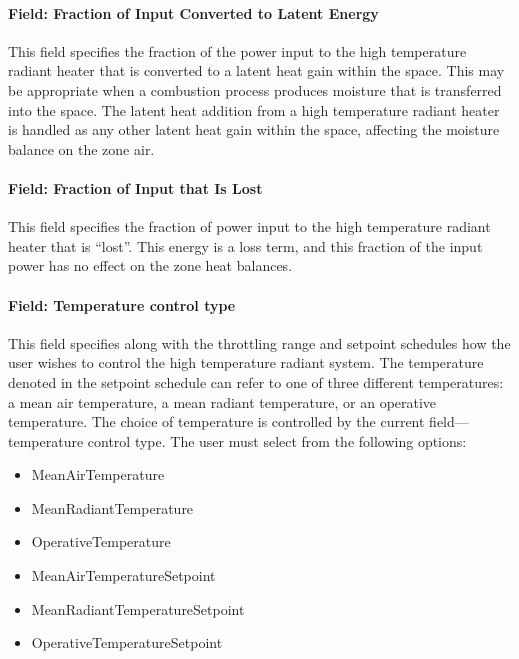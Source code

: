 \paragraph{Field: Fraction of Input Converted to Latent Energy}\label{field-fraction-of-input-converted-to-latent-energy}

This field specifies the fraction of the power input to the high temperature radiant heater that is converted to a latent heat gain within the space. This may be appropriate when a combustion process produces moisture that is transferred into the space. The latent heat addition from a high temperature radiant heater is handled as any other latent heat gain within the space, affecting the moisture balance on the zone air.

\paragraph{Field: Fraction of Input that Is Lost}\label{field-fraction-of-input-that-is-lost}

This field specifies the fraction of power input to the high temperature radiant heater that is ``lost''. This energy is a loss term, and this fraction of the input power has no effect on the zone heat balances.

\paragraph{Field: Temperature control type}\label{field-temperature-control-type-3}

This field specifies along with the throttling range and setpoint schedules how the user wishes to control the high temperature radiant system. The temperature denoted in the setpoint schedule can refer to one of three different temperatures: a mean air temperature, a mean radiant temperature, or an operative temperature. The choice of temperature is controlled by the current field---temperature control type. The user must select from the following options:

\begin{itemize}
\item
  MeanAirTemperature
\item
  MeanRadiantTemperature
\item
  OperativeTemperature
\item
  MeanAirTemperatureSetpoint
\item
  MeanRadiantTemperatureSetpoint
\item
  OperativeTemperatureSetpoint
\end{itemize}


